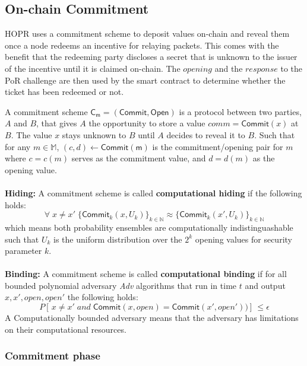 \subsection{On-chain Commitment}

HOPR uses a commitment scheme to deposit values on-chain and reveal them once a node redeems an incentive for relaying packets. This comes with the benefit that the redeeming party discloses a secret that is unknown to the issuer of the incentive until it is claimed on-chain. The $opening$ and the $response$ to the PoR challenge are then used by the smart contract to determine whether the ticket has been redeemed or not.

\begin{defnsub}
    A commitment scheme $\mathsf{C_m} = (\mathsf{Commit}, \mathsf{Open})$ is a protocol between two parties, $A$ and $B$, that gives $A$ the opportunity to store a value $comm = \mathsf{Commit}(x)$ at $B$. The value $x$ stays unknown to $B$ until $A$ decides to reveal it to $B$.
    Such that for any $m\in \mathbb{M}$, $(c,d)\leftarrow \mathsf{Commit(m)}$ is the commitment/opening pair for $m$ where $c = c(m)$ serves as the commitment value, and $d = d(m)$ as the opening value.
    \\~\\ \noindent\textbf{Hiding:} A commitment scheme is called \textbf{computational hiding} if the following holds:
    $$\forall \;x\neq x' \; \{\mathsf{Commit}_k(x,U_k)\}_{k\in\mathbb{N}}\approx\{{\mathsf{Commit}_k(x',U_k)}\}_{k\in\mathbb{N}}$$ which means both probability ensembles are computationally indistinguashable such that $U_{k}$ is the uniform distribution over the $2^{k}$ opening values for security parameter $k$.
    \\~\\\noindent\textbf{Binding:} A commitment scheme is called \textbf{computational binding} if for all bounded polynomial adversary \textit{Adv} algorithms that run in time $t$ and output $x,x',open,open'$ the following holds:
    $$P	[ \,x\neq x' \; and \; \mathsf{Commit}(x,open)={\mathsf{Commit}(x',open')})] \,\leq \epsilon$$ A Computationally bounded adversary means that the adversary has limitations on their computational resources. 

\end{defnsub}

\subsubsection{Commitment phase}

